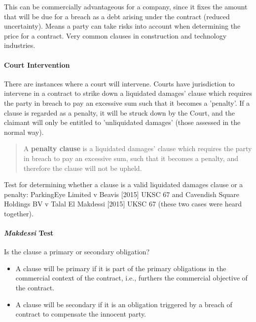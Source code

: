 \documentclass[
]{article}
\providecommand{\tightlist}{%
  \setlength{\itemsep}{0pt}\setlength{\parskip}{0pt}}
\begin{document}
This can be commercially advantageous for a company, since it fixes the
amount that will be due for a breach as a debt arising under the
contract (reduced uncertainty). Means a party can take risks into
account when determining the price for a contract. Very common clauses
in construction and technology industries.

\hypertarget{court-intervention}{%
\paragraph{Court Intervention}\label{court-intervention}}

There are instances where a court will intervene. Courts have
jurisdiction to intervene in a contract to strike down a liquidated
damages' clause which requires the party in breach to pay an excessive
sum such that it becomes a 'penalty'. If a clause is regarded as a
penalty, it will be struck down by the Court, and the claimant will only
be entitled to 'unliquidated damages' (those assessed in the normal
way).

\begin{quote}
A \textbf{penalty clause} is a liquidated damages' clause which requires
the party in breach to pay an excessive sum, such that it becomes a
penalty, and therefore the clause will not be upheld.
\end{quote}

Test for determining whether a clause is a valid liquidated damages
clause or a penalty: ParkingEye Limited v Beavis {[}2015{]} UKSC 67 and
Cavendish Square Holdings BV v Talal El Makdessi {[}2015{]} UKSC 67
(these two cases were heard together).

\hypertarget{makdessi-test}{%
\paragraph{\texorpdfstring{\emph{Makdessi}
Test}{Makdessi Test}}\label{makdessi-test}}

Is the clause a primary or secondary obligation?

\begin{itemize}
\tightlist
\item
  A clause will be primary if it is part of the primary obligations in
  the commercial context of the contract, i.e., furthers the commercial
  objective of the contract.
\item
  A clause will be secondary if it is an obligation triggered by a
  breach of contract to compensate the innocent party.
\end{itemize}
\end{document}
